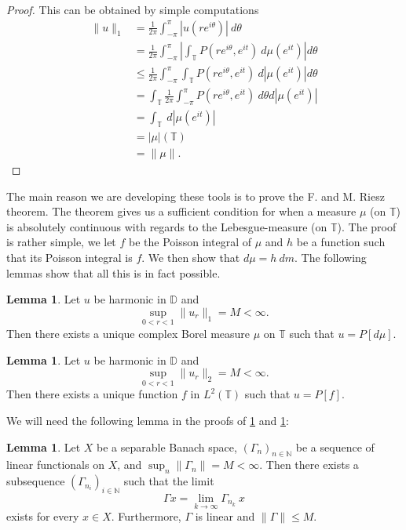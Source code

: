 \documentclass[a4paper,12pt,twoside,BCOR=10mm]{scrbook}
\theoremstyle{definition}
\theoremstyle{definition}
\newtheorem{lemma}[theorem]{Lemma}
\theoremstyle{definition}
\begin{document}
\begin{proof}
This can be obtained by simple computations
\begin{align*}
	\|u\|_1
	&= \frac{1}{2\pi} \int_{-\pi}^{\pi} |u(re^{i\theta})|\ d\theta\\
	&= \frac{1}{2\pi} \int_{-\pi}^{\pi} \left | \int_{\mathbb{T}} P(re^{i\theta}, e^{it})\ d\mu(e^{it}) \right | d\theta\\
	&\leq \frac{1}{2\pi} \int_{-\pi}^{\pi} \int_{\mathbb{T}} P(re^{i\theta}, e^{it})\ d|\mu(e^{it})| d\theta\\
	&= \int_{\mathbb{T}} \frac{1}{2\pi} \int_{-\pi}^{\pi} P(re^{i\theta}, e^{it})\ d\theta d|\mu(e^{it})|\\ 
	&= \int_{\mathbb{T}}\ d|\mu(e^{it})|\\
	&= |\mu|(\mathbb{T})\\
	&= \|\mu\|.
\end{align*}
\end{proof}
The main reason we are developing these tools is to prove the F. and M. Riesz theorem.
The theorem gives us a sufficient condition for when a measure $\mu$ (on $\mathbb{T}$) is absolutely continuous with regards to the Lebesgue-measure (on $\mathbb{T}$).
The proof is rather simple, we let $f$ be the Poisson integral of $\mu$ and $h$ be a function such that its Poisson integral is $f$.
We then show that $d\mu = h\ dm$. %
The following lemmas show that all this is in fact possible.
\begin{lemma}
\label{FMRlemma3}
Let $u$ be harmonic in $\mathbb{D}$ and
\[
	\sup_{0 < r < 1} \|u_r\|_1 = M < \infty.
\]
Then there exists a unique complex Borel measure $\mu$ on $\mathbb{T}$ such that $u = P[d\mu]$.
\end{lemma}
\begin{lemma}
\label{FMRlemma3b}
Let $u$ be harmonic in $\mathbb{D}$ and
\[
	\sup_{0 < r < 1} \|u_r\|_2 = M < \infty.
\]
Then there exists a unique function $f$ in $L^2(\mathbb{T})$ such that $u = P[f]$.
\end{lemma}
We will need the following lemma in the proofs of \ref{FMRlemma3} and \ref{FMRlemma3b}:
\begin{lemma}
\label{FMRlemma31}
Let $X$ be a separable Banach space,
	$(\Gamma_n)_{n \in \mathbb{N}}$ be a sequence of linear functionals on $X$,
	and $\sup_n \|\Gamma_n\| = M < \infty$.
Then there exists a subsequence $(\Gamma_{n_i})_{i \in \mathbb{N}}$ such that the limit 
\[
	\Gamma x = \lim_{k \rightarrow \infty} \Gamma_{n_k}\ x
\]
exists for every $x \in X$.
Furthermore, $\Gamma$ is linear and $\|\Gamma\| \leq M$.
\end{lemma}
\end{document}
